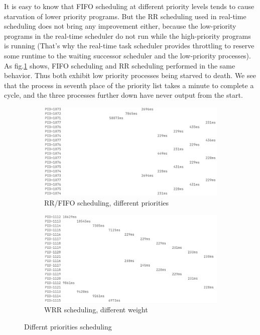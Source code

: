 \documentclass[11pt]{article}
\begin{document}
It is easy to know that FIFO scheduling at different priority levels
tends to cause starvation of lower priority programs. But the RR
scheduling used in real-time scheduling does not bring any improvement
either, because the low-priority programs in the real-time scheduler do
not run while the high-priority programs is running (That's why the
real-time task scheduler provides throttling to reserve some runtime to
the waiting successor scheduler and the low-priority processes). 
As fig.\ref{fig:rtdiff} shows, FIFO
scheduling and RR scheduling performed in the same behavior. Thus both
exhibit low priority processes being starved to death. We see that the
process in seventh place of the priority list takes a minute to complete
a cycle, and the three processes further down have never output from the
start.

\begin{figure}[ht]
  \begin{subfigure}{.5\textwidth}
    \centering
    \includegraphics[width=\textwidth]{RT-example.png}
    \caption{RR/FIFO scheduling, different priorities}
    \label{fig:rtdiff}
  \end{subfigure}
  \begin{subfigure}{.5\textwidth}
    \centering
    \includegraphics[width=\textwidth]{WRR-example.png}
    \caption{WRR scheduling, different weight}
    \label{fig:wrrdiff}
  \end{subfigure}
  \caption{Differnt priorities scheduling}
  \label{fig:diff}
  \end{figure}
\end{document}
